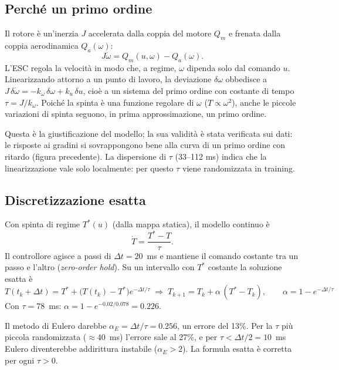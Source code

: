 \documentclass[11pt,a4paper]{article}
\begin{document}
\subsection{Perché un primo ordine}
Il rotore è un'inerzia $J$ accelerata dalla coppia del motore $Q_m$ e frenata dalla coppia
aerodinamica $Q_a(\omega)$:
\begin{equation}
J\dot\omega = Q_m(u,\omega) - Q_a(\omega).
\end{equation}
L'ESC regola la velocità in modo che, a regime, $\omega$ dipenda solo dal comando $u$.
Linearizzando attorno a un punto di lavoro, la deviazione $\delta\omega$ obbedisce a
$J\,\delta\dot\omega = -k_\omega\,\delta\omega + k_u\,\delta u$, cioè a un sistema del primo ordine con
costante di tempo $\tau = J/k_\omega$. Poiché la spinta è una funzione regolare di $\omega$
($T\propto\omega^2$), anche le piccole variazioni di spinta seguono, in prima approssimazione, un primo ordine.

Questa è la giustificazione del modello; la sua validità è stata verificata sui dati: le risposte ai
gradini si sovrappongono bene alla curva di un primo ordine con ritardo (figura precedente).
La dispersione di $\tau$ (33--112 ms) indica che la linearizzazione vale solo localmente: per questo
$\tau$ viene randomizzata in training.

\subsection{Discretizzazione esatta}
Con spinta di regime $T^*(u)$ (dalla mappa statica), il modello continuo è
\begin{equation}
\dot T = \frac{T^* - T}{\tau}.
\end{equation}
Il controllore agisce a passi di $\Delta t = 20$~ms e mantiene il comando costante tra un passo e
l'altro (\emph{zero-order hold}). Su un intervallo con $T^*$ costante la soluzione esatta è
\begin{equation}
T(t_k + \Delta t) = T^* + \big(T(t_k) - T^*\big)e^{-\Delta t/\tau}
\;\Rightarrow\;
\boxed{T_{k+1} = T_k + \alpha\,(T^* - T_k),\qquad \alpha = 1 - e^{-\Delta t/\tau}}
\end{equation}
Con $\tau = 78$~ms: $\alpha = 1 - e^{-0.02/0.078} = 0.226$.

\begin{nota}
Il metodo di Eulero darebbe $\alpha_E = \Delta t/\tau = 0.256$, un errore del 13\%. Per la $\tau$ più
piccola randomizzata ($\approx40$~ms) l'errore sale al 27\%, e per $\tau < \Delta t/2 = 10$~ms Eulero
diventerebbe addirittura instabile ($\alpha_E>2$). La formula esatta è corretta per ogni $\tau>0$.
\end{nota}
\end{document}
